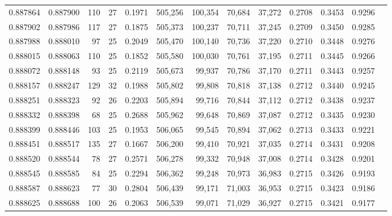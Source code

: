 \begin{tabular}{rrrrrrrrrrrrr}
0.887864 & 0.887900 &   110 &  27 &                                     0.1971 & 505,256 & 100,354 &  70,684 &  37,272 & 0.2708 & 0.3453 & 0.9296 \\
0.887902 & 0.887986 &   117 &  27 &                                     0.1875 & 505,373 & 100,237 &  70,711 &  37,245 & 0.2709 & 0.3450 & 0.9285 \\
0.887988 & 0.888010 &    97 &  25 &                                     0.2049 & 505,470 & 100,140 &  70,736 &  37,220 & 0.2710 & 0.3448 & 0.9276 \\
0.888015 & 0.888063 &   110 &  25 &                                     0.1852 & 505,580 & 100,030 &  70,761 &  37,195 & 0.2711 & 0.3445 & 0.9266 \\
0.888072 & 0.888148 &    93 &  25 &                                     0.2119 & 505,673 &  99,937 &  70,786 &  37,170 & 0.2711 & 0.3443 & 0.9257 \\
0.888157 & 0.888247 &   129 &  32 &                                     0.1988 & 505,802 &  99,808 &  70,818 &  37,138 & 0.2712 & 0.3440 & 0.9245 \\
0.888251 & 0.888323 &    92 &  26 &                                     0.2203 & 505,894 &  99,716 &  70,844 &  37,112 & 0.2712 & 0.3438 & 0.9237 \\
0.888332 & 0.888398 &    68 &  25 &                                     0.2688 & 505,962 &  99,648 &  70,869 &  37,087 & 0.2712 & 0.3435 & 0.9230 \\
0.888399 & 0.888446 &   103 &  25 &                                     0.1953 & 506,065 &  99,545 &  70,894 &  37,062 & 0.2713 & 0.3433 & 0.9221 \\
0.888451 & 0.888517 &   135 &  27 &                                     0.1667 & 506,200 &  99,410 &  70,921 &  37,035 & 0.2714 & 0.3431 & 0.9208 \\
0.888520 & 0.888544 &    78 &  27 &                                     0.2571 & 506,278 &  99,332 &  70,948 &  37,008 & 0.2714 & 0.3428 & 0.9201 \\
0.888545 & 0.888585 &    84 &  25 &                                     0.2294 & 506,362 &  99,248 &  70,973 &  36,983 & 0.2715 & 0.3426 & 0.9193 \\
0.888587 & 0.888623 &    77 &  30 &                                     0.2804 & 506,439 &  99,171 &  71,003 &  36,953 & 0.2715 & 0.3423 & 0.9186 \\
0.888625 & 0.888688 &   100 &  26 &                                     0.2063 & 506,539 &  99,071 &  71,029 &  36,927 & 0.2715 & 0.3421 & 0.9177 \\

\end{tabular}

